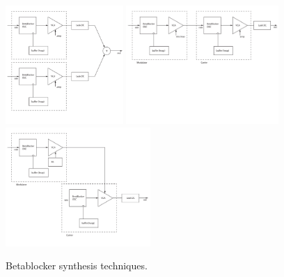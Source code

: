 \documentclass[letterpaper, 12pt]{article}
\begin{document}
\begin{figure}
	\centering
		\includegraphics[height=4.5cm]{Additive-Betablocker}
		\includegraphics[height=4.5cm]{FM-Betablocker}
		\includegraphics[height=4.5cm]{AM-Betablocker}
	\caption{Betablocker synthesis techniques.}
	\label{fig:classicSynthesisTechniquesFMAMAdditive}
\end{figure}
\end{document}
